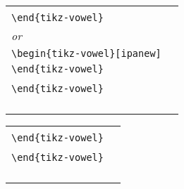 \documentclass{article}
\begin{document}
\begin{center}
\begin{tabular}{ll}
  \begin{minipage}[t]{6.5cm}{\small
    \verb|\begin{tikz-vowel}|\\
    \verb|\end{tikz-vowel}|\\
    \emph{or}\\
    \verb|\begin{tikz-vowel}[ipanew]|\\
    \verb|\end{tikz-vowel}|\\}
  \end{minipage} &
  \begin{minipage}[t]{6.5cm}{\small
    \verb|\begin{tikz-vowel}[plain]|\\
    \verb|\end{tikz-vowel}|\\}
  \end{minipage} \\
  \begin{minipage}[t]{6.5cm}{
  \begin{tikz-vowel}[ipanew]\end{tikz-vowel} \\}\end{minipage} &
  \begin{minipage}[t]{6.5cm}{
  \begin{tikz-vowel}[plain]\end{tikz-vowel} \\}\end{minipage}
\end{tabular}

\begin{tabular}{ll}
  \begin{minipage}[t]{6.5cm}{\small
    \verb|\begin{tikz-vowel}[simple]|\\
    \verb|\end{tikz-vowel}|\\}
  \end{minipage} &
  \begin{minipage}[t]{6.5cm}{\small
    \verb|\begin{tikz-vowel}[standard]|\\
    \verb|\end{tikz-vowel}|\\}
  \end{minipage} \\
  \begin{minipage}[t]{6.5cm}{
  \begin{tikz-vowel}[simple]\end{tikz-vowel} \\}\end{minipage} &
  \begin{minipage}[t]{6.5cm}{
  \begin{tikz-vowel}[standard]\end{tikz-vowel} \\}\end{minipage}
\end{tabular}


\end{center}
\end{document}
